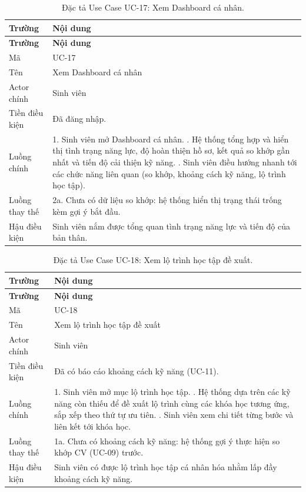 \begin{longtable}{|L{3.5cm}|L{10cm}|}
\caption{Đặc tả Use Case UC-17: Xem Dashboard cá nhân.}
\label{tab:uc17} \\
\hline
\textbf{Trường} & \textbf{Nội dung} \\
\hline
\endfirsthead
\hline
\textbf{Trường} & \textbf{Nội dung} \\
\hline
\endhead
Mã & UC-17 \\
\hline
Tên & Xem Dashboard cá nhân \\
\hline
Actor chính & Sinh viên \\
\hline
Tiền điều kiện & Đã đăng nhập. \\
\hline
Luồng chính & 1. Sinh viên mở Dashboard cá nhân. . Hệ thống tổng hợp và hiển thị tình trạng năng lực, độ hoàn thiện hồ sơ, kết quả so khớp gần nhất và tiến độ cải thiện kỹ năng. . Sinh viên điều hướng nhanh tới các chức năng liên quan (so khớp, khoảng cách kỹ năng, lộ trình học tập). \\
\hline
Luồng thay thế & 2a. Chưa có dữ liệu so khớp: hệ thống hiển thị trạng thái trống kèm gợi ý bắt đầu. \\
\hline
Hậu điều kiện & Sinh viên nắm được tổng quan tình trạng năng lực và tiến độ của bản thân. \\
\hline
\end{longtable}

\begin{longtable}{|L{3.5cm}|L{10cm}|}
\caption{Đặc tả Use Case UC-18: Xem lộ trình học tập đề xuất.}
\label{tab:uc18} \\
\hline
\textbf{Trường} & \textbf{Nội dung} \\
\hline
\endfirsthead
\hline
\textbf{Trường} & \textbf{Nội dung} \\
\hline
\endhead
Mã & UC-18 \\
\hline
Tên & Xem lộ trình học tập đề xuất \\
\hline
Actor chính & Sinh viên \\
\hline
Tiền điều kiện & Đã có báo cáo khoảng cách kỹ năng (UC-11). \\
\hline
Luồng chính & 1. Sinh viên mở mục lộ trình học tập. . Hệ thống dựa trên các kỹ năng còn thiếu để đề xuất lộ trình cùng các khóa học tương ứng, sắp xếp theo thứ tự ưu tiên. . Sinh viên xem chi tiết từng bước và liên kết tới khóa học. \\
\hline
Luồng thay thế & 1a. Chưa có khoảng cách kỹ năng: hệ thống gợi ý thực hiện so khớp CV (UC-09) trước. \\
\hline
Hậu điều kiện & Sinh viên có được lộ trình học tập cá nhân hóa nhằm lấp đầy khoảng cách kỹ năng. \\
\hline
\end{longtable}

